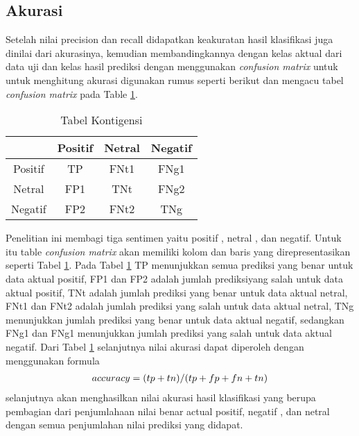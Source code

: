 \subsection*{Akurasi}
Setelah nilai precision dan recall didapatkan keakuratan hasil klasifikasi juga dinilai dari akurasinya, kemudian membandingkannya dengan kelas aktual dari data uji dan kelas hasil prediksi dengan menggunakan \textit{confusion matrix} untuk untuk menghitung akurasi digunakan rumus seperti berikut dan mengacu tabel \textit{confusion matrix} pada Table \ref{tab:konsep}. 

\begin{table}[hbt]
	\caption{Tabel Kontigensi}
	\centering
	\begin{adjustbox}{max width=\textwidth}
		\begin{tabular}{*{4}{c}}%
			\toprule
			 & Positif & Netral & Negatif \\
			\midrule
			Positif & TP & FNt1 & FNg1 \\
			Netral & FP1 & TNt & FNg2 \\
			Negatif & FP2 & FNt2 & TNg \\
			\bottomrule
		\end{tabular}
	\end{adjustbox}
	\label{tab:konsep}
\end{table}

Penelitian ini membagi tiga sentimen yaitu positif , netral , dan negatif. Untuk itu table \textit{confusion matrix} akan memiliki kolom dan baris yang direpresentasikan seperti Tabel \ref{tab:konsep}. Pada Tabel \ref{tab:konsep} TP menunjukkan semua prediksi yang benar untuk data aktual positif, FP1 dan FP2 adalah jumlah prediksiyang salah untuk data aktual positif, TNt adalah jumlah prediksi yang benar untuk data aktual netral, FNt1 dan FNt2 adalah jumlah prediksi yang salah untuk data aktual netral, TNg menunjukkan jumlah prediksi yang benar untuk data aktual negatif, sedangkan FNg1 dan FNg1 menunjukkan jumlah prediksi yang salah untuk data aktual negatif. Dari Tabel \ref{tab:konsep} selanjutnya nilai akurasi dapat diperoleh dengan menggunakan formula
\begin{equation}
\begin{split}
\tiny
accuracy = (tp+tn)/(tp+fp+fn+tn)
\label{eq:akurasi}
\normalsize
\end{split}
\end{equation}
selanjutnya akan menghasilkan nilai akurasi hasil klasifikasi yang berupa pembagian dari penjumlahaan nilai benar actual positif, negatif , dan netral dengan semua penjumlahan nilai prediksi yang didapat.

